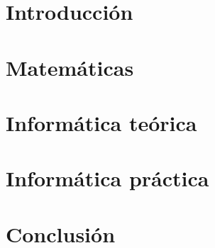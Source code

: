 \documentclass[openany]{book}
\begin{document}

\part{Introducción}





\part{Matemáticas}









\part{Informática teórica}





 

\part{Informática práctica}





\part{Conclusión}


 



\renewcommand{\chaptername}{}
\printbibliography[heading=bibintoc]
\nocite{*}
\end{document}
